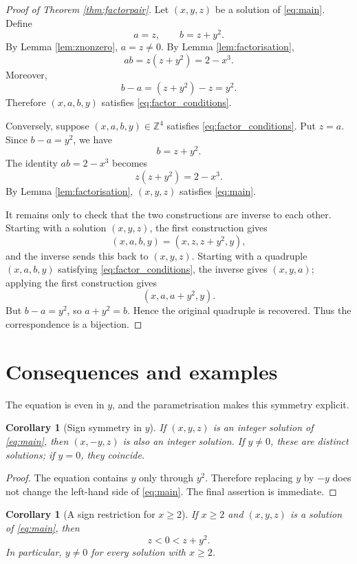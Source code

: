 \documentclass[11pt,a4paper]{amsart}
\newtheorem{corollary}[theorem]{Corollary}
\theoremstyle{definition}
\newcommand{\Z}{\mathbb Z}
\begin{document}
\begin{proof}[Proof of Theorem \ref{thm:factorpair}]
Let $(x,y,z)$ be a solution of \eqref{eq:main}. Define
\[
        a=z,
        \qquad b=z+y^2.
\]
By Lemma \ref{lem:znonzero}, $a=z\ne0$. By Lemma \ref{lem:factorisation},
\[
        ab=z(z+y^2)=2-x^3.
\]
Moreover,
\[
        b-a=(z+y^2)-z=y^2.
\]
Therefore $(x,a,b,y)$ satisfies \eqref{eq:factor_conditions}.

Conversely, suppose $(x,a,b,y)\in\Z^4$ satisfies \eqref{eq:factor_conditions}. Put $z=a$. Since $b-a=y^2$, we have
\[
        b=z+y^2.
\]
The identity $ab=2-x^3$ becomes
\[
        z(z+y^2)=2-x^3.
\]
By Lemma \ref{lem:factorisation}, $(x,y,z)$ satisfies \eqref{eq:main}.

It remains only to check that the two constructions are inverse to each other. Starting with a solution $(x,y,z)$, the first construction gives
\[
        (x,a,b,y)=(x,z,z+y^2,y),
\]
and the inverse sends this back to $(x,y,z)$. Starting with a quadruple $(x,a,b,y)$ satisfying \eqref{eq:factor_conditions}, the inverse gives $(x,y,a)$; applying the first construction gives
\[
        (x,a,a+y^2,y).
\]
But $b-a=y^2$, so $a+y^2=b$. Hence the original quadruple is recovered. Thus the correspondence is a bijection.
\end{proof}

\section{Consequences and examples}

The equation is even in $y$, and the parametrisation makes this symmetry explicit.

\begin{corollary}[Sign symmetry in $y$]\label{cor:y_symmetry}
If $(x,y,z)$ is an integer solution of \eqref{eq:main}, then $(x,-y,z)$ is also an integer solution. If $y\ne0$, these are distinct solutions; if $y=0$, they coincide.
\end{corollary}

\begin{proof}
The equation contains $y$ only through $y^2$. Therefore replacing $y$ by $-y$ does not change the left-hand side of \eqref{eq:main}. The final assertion is immediate.
\end{proof}

\begin{corollary}[A sign restriction for $x\ge2$]\label{cor:sign_restriction}
If $x\ge2$ and $(x,y,z)$ is a solution of \eqref{eq:main}, then
\[
        z<0<z+y^2.
\]
In particular, $y\ne0$ for every solution with $x\ge2$.
\end{corollary}
\end{document}
